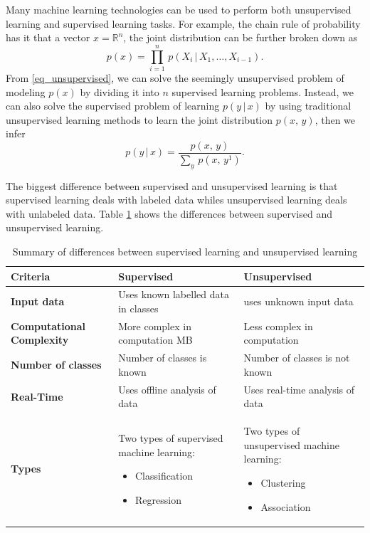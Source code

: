 \documentclass[master]{thesis-uestc}
\begin{document}
Many machine learning technologies can be used to perform both unsupervised learning and supervised learning tasks. For example, the chain rule of probability has it that a vector $x = \mathbb{R}^n$, the joint distribution can be further broken down as
\begin{equation}
    p(x) = {\displaystyle \prod_{i=1}^{n}}\,p(X_i\,|\,X_1,\dots,X_{i-1}).
    \label{eq_unsupervised}
\end{equation}
From \ref{eq_unsupervised}, we can solve the seemingly unsupervised problem of modeling $p(x)$ by dividing it into $n$ supervised learning problems. Instead, we can also solve the supervised problem of learning $p(y\,|\,x)$ by using traditional unsupervised learning methods to learn the joint distribution $p(x,\,y)$, then we infer
\begin{equation}
    p(y\,|\,x) = \frac{p(x,\,y)}{\sum_y\,p(x,\,y^1)}.
\end{equation}

The biggest difference between supervised and unsupervised learning is that supervised learning deals with labeled data whiles unsupervised learning deals with unlabeled data. Table \ref{diff_supervised_unsupervised} shows the differences between supervised and unsupervised learning.

\begin{center}
\begin{table}
\caption{Summary of differences between supervised learning and unsupervised learning}
\begin{tabular}{ | m{10em} | m{5cm}| m{5cm} | } 
\hline
\textbf{Criteria} & \textbf{Supervised} & \textbf{Unsupervised} \\ 
\hline
\textbf{Input data} & Uses known labelled data in classes & uses unknown input data  \\ 
\hline
\textbf{Computational Complexity} & More complex in computation MB & Less complex in computation \\ 
\hline
\textbf{Number of classes} & Number of classes is known & Number of classes is not known \\
\hline
\textbf{Real-Time} & Uses offline analysis of data & Uses real-time analysis of data \\
\hline
\textbf{Types} & Two types of supervised machine learning:
\begin{itemize}
    \item Classification
    \item Regression
\end{itemize}& Two types of unsupervised machine learning:
\begin{itemize}
    \item Clustering
    \item Association
\end{itemize}\\
\hline
\end{tabular}
\label{diff_supervised_unsupervised}
\end{table}
\end{center}
\end{document}
